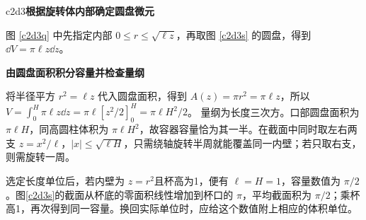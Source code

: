 \begin{drillsolution}{c2d3}\textbf{根据旋转体内部确定圆盘微元}\par\nobreak
图 \ref{c2d3q} 中先指定内部 $0\le r\le\sqrt{\ell z}$，再取图 \ref{c2d3s} 的圆盘，得到 $\dd V=\pi\ell z\dd z$。


\par\medskip{}\noindent\textbf{由圆盘面积积分容量并检查量纲}\par\nobreak
将半径平方 $r^2=\ell z$ 代入圆盘面积，得到 $A(z)=\pi r^2=\pi\ell z$，所以
$V=\int_0^H\pi\ell z\dd z=\pi\ell[z^2/2]_0^H=\boxed{\pi\ell H^2/2}$。
量纲为长度三次方。口部圆盘面积为 $\pi\ell H$，同高圆柱体积为 $\pi\ell H^2$，故容器容量恰为其一半。在截面中同时取左右两支 $z=x^2/\ell$，$|x|\le\sqrt{\ell H}$，只需绕轴旋转半周就能覆盖同一内壁；若只取右支，则需旋转一周。

选定长度单位后，若内壁为 $z=r^2$且杯高为1，便有 $\ell=H=1$，容量数值为 $\pi/2$。图\ref{c2d3s}的截面从杯底的零面积线性增加到杯口的 $\pi$，平均截面积为 $\pi/2$；乘杯高1，再次得到同一容量。换回实际单位时，应给这个数值附上相应的体积单位。
\end{drillsolution}
